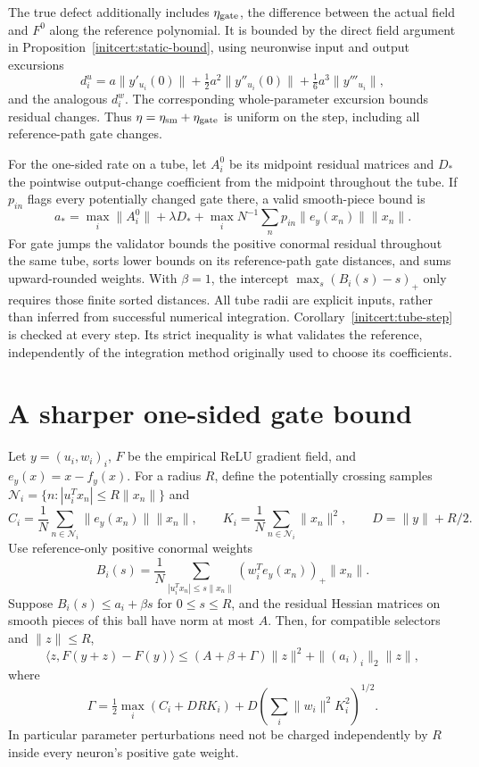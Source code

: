 \documentclass[10pt]{article}
\begin{document}
The true defect additionally includes $\eta_{\rm gate}$, the difference
between the actual field and $F^0$ along the reference polynomial.
It is bounded by the direct field argument in
Proposition~\ref{initcert:static-bound}, using neuronwise input and output excursions
\[
 d_i^u=a\|y'_{u_i}(0)\|+\tfrac12a^2\|y''_{u_i}(0)\|
                    +\tfrac16a^3\|y'''_{u_i}\|,
\]
and the analogous $d_i^w$. The corresponding whole-parameter excursion
bounds residual changes. Thus $\eta=\eta_{\rm sm}+\eta_{\rm gate}$ is
uniform on the step, including all reference-path gate changes.

For the one-sided rate on a tube, let $A_i^0$ be its midpoint residual
matrices and $D_*$ the pointwise output-change coefficient from the midpoint
throughout the tube. If $p_{in}$ flags every potentially changed gate there,
a valid smooth-piece bound is
\[
 a_* = \max_i\|A_i^0\|+\lambda D_*
       +\max_i N^{-1}\sum_n p_{in}\|e_y(x_n)\|\|x_n\|.
\]
For gate jumps the validator bounds the positive conormal residual throughout
the same tube, sorts lower bounds on its reference-path gate distances,
and sums upward-rounded weights. With $\beta=1$, the intercept
$\max_s(B_i(s)-s)_+$ only requires those finite sorted distances.
All tube radii are explicit inputs, rather than inferred from successful
numerical integration. Corollary~\ref{initcert:tube-step} is checked at every
step. Its strict inequality is what validates the reference, independently
of the integration method originally used to choose its coefficients.

\section{A sharper one-sided gate bound}
Let $y=(u_i,w_i)_i$, $F$ be the empirical ReLU gradient field, and
$e_y(x)=x-f_y(x)$. For a radius $R$, define the potentially crossing samples
$\mathcal N_i=\{n:|u_i^Tx_n|\le R\|x_n\|\}$ and
\[
 C_i=\frac1N\sum_{n\in\mathcal N_i}\|e_y(x_n)\|\|x_n\|,
 \qquad K_i=\frac1N\sum_{n\in\mathcal N_i}\|x_n\|^2,
 \qquad D=\|y\|+R/2.
\]
Use reference-only positive conormal weights
\[
 B_i(s)=\frac1N\sum_{|u_i^Tx_n|\le s\|x_n\|}
                 (w_i^Te_y(x_n))_+\|x_n\|.
\]
Suppose $B_i(s)\le a_i+\beta s$ for $0\le s\le R$, and the residual
Hessian matrices on smooth pieces of this ball have norm at most $A$.
Then, for compatible selectors and $\|z\|\le R$,
\begin{equation}\label{eq:sharp-gate-stability}
 \langle z,F(y+z)-F(y)\rangle
 \le (A+\beta+\Gamma)\|z\|^2+\|(a_i)_i\|_2\|z\|,
\end{equation}
where
\[
 \Gamma=\tfrac12\max_i(C_i+DRK_i)
       +D\left(\sum_i\|w_i\|^2K_i^2\right)^{1/2}.
\]
In particular parameter perturbations need not be charged independently by
$R$ inside every neuron's positive gate weight.
\end{document}
